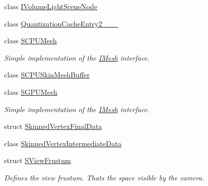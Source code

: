 \begin{DoxyCompactItemize}
class \hyperlink{classirr_1_1scene_1_1IVolumeLightSceneNode}{I\+Volume\+Light\+Scene\+Node}
\item 
class \hyperlink{classirr_1_1scene_1_1QuantizationCacheEntry2__10__10__10}{Quantization\+Cache\+Entry2\+\_\+\_\+\_}
\item 
class \hyperlink{classirr_1_1scene_1_1SCPUMesh}{S\+C\+P\+U\+Mesh}
\begin{DoxyCompactList}\small\item\em Simple implementation of the \hyperlink{classirr_1_1scene_1_1IMesh}{I\+Mesh} interface. \end{DoxyCompactList}\item 
class \hyperlink{classirr_1_1scene_1_1SCPUSkinMeshBuffer}{S\+C\+P\+U\+Skin\+Mesh\+Buffer}
\item 
class \hyperlink{classirr_1_1scene_1_1SGPUMesh}{S\+G\+P\+U\+Mesh}
\begin{DoxyCompactList}\small\item\em Simple implementation of the \hyperlink{classirr_1_1scene_1_1IMesh}{I\+Mesh} interface. \end{DoxyCompactList}\item 
struct \hyperlink{structirr_1_1scene_1_1SkinnedVertexFinalData}{Skinned\+Vertex\+Final\+Data}
\item 
class \hyperlink{classirr_1_1scene_1_1SkinnedVertexIntermediateData}{Skinned\+Vertex\+Intermediate\+Data}
\item 
struct \hyperlink{structirr_1_1scene_1_1SViewFrustum}{S\+View\+Frustum}
\begin{DoxyCompactList}\small\item\em Defines the view frustum. That\textquotesingle{}s the space visible by the camera. \end{DoxyCompactList}\end{DoxyCompactItemize}

